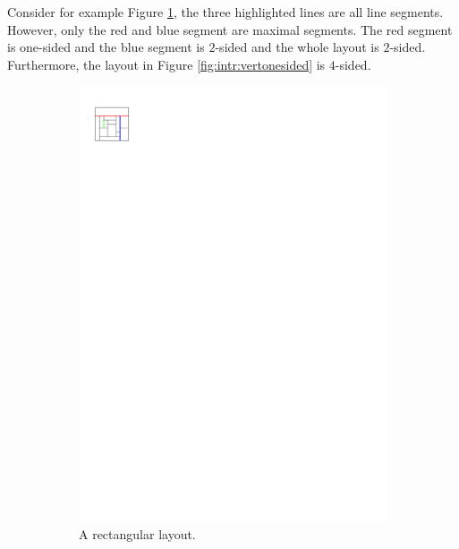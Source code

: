   Consider for example Figure \ref{fig:intr:segmentdefs}, the three highlighted lines are all line segments. However, only the red and blue segment are maximal segments. The red segment is one-sided and the blue segment is $2$-sided and the whole layout is $2$-sided. Furthermore, the layout in Figure \ref{fig:intr:vertonesided} is $4$-sided.

  \begin{figure}[b]
      \centering
      \begin{subfigure}[b]{0.45 \textwidth}
        \centering
        \includegraphics[scale=1]{rectangularDuals/img/segmentdefs}
        \caption{A rectangular layout.}
        \label{fig:intr:segmentdefs}
      \end{subfigure}
      ~
      \begin{subfigure}[b]{0.45 \textwidth}
        \centering

\end{subfigure}
\end{figure}
